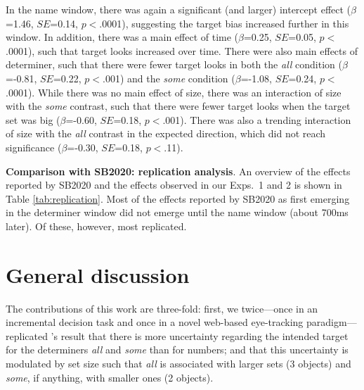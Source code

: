 \documentclass[10pt,letterpaper]{article}
\newcommand{\tableref}[1]{Table \ref{#1}}
\begin{document}
In the name window, there was again a significant (and larger) intercept effect ($\beta$=1.46, $SE$=0.14, $p<$.0001), suggesting the target bias increased further in this window. In addition,  there was a main effect of time  ($\beta$=0.25, $SE$=0.05, $p<$.0001), such that target looks increased over time. There were also main effects of determiner, such that there were fewer target looks in both the \emph{all} condition  ($\beta$=-0.81, $SE$=0.22, $p<$.001) and the \emph{some} condition   ($\beta$=-1.08, $SE$=0.24, $p<$.0001). While there was no main effect of size, there was an interaction of size with the \emph{some} contrast, such that there were fewer target looks when the target set was big   ($\beta$=-0.60, $SE$=0.18, $p<$.001). There was also a trending interaction of size with the \emph{all} contrast in the expected direction, which did not reach significance ($\beta$=-0.30, $SE$=0.18, $p<$.11).





\textbf{Comparison with SB2020: replication analysis}. An overview of the effects reported by SB2020 and the effects observed in our Exps.~1 and 2 is shown in \tableref{tab:replication}. Most of the effects reported by SB2020 as first emerging in the determiner window did not emerge until the name window (about 700ms later). Of these, however, most replicated.

\section{General discussion}

The contributions of this work are three-fold: first, we twice---once in an incremental decision task and once in a novel web-based eye-tracking paradigm---replicated  's result that there is more uncertainty regarding the intended target for the determiners \emph{all} and \emph{some} than for numbers; and that this uncertainty is modulated by set size such that \emph{all} is associated with larger sets (3 objects) and \emph{some}, if anything, with smaller ones (2 objects). 
\end{document}
